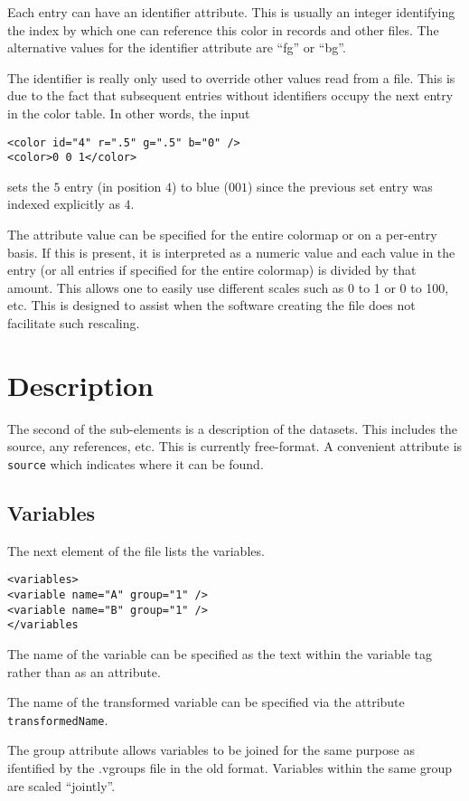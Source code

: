\documentclass{article}
\begin{document}
Each entry can have an identifier attribute.  This is usually an
integer identifying the index by which one can reference this color in
records and other files.  The alternative values for the identifier
attribute are ``fg'' or ``bg''.

The identifier is really only used to override other values read from
a file.  This is due to the fact that subsequent entries without
identifiers occupy the next entry  in the color table.
In other words, the input
\begin{verbatim}
<color id="4" r=".5" g=".5" b="0" />
<color>0 0 1</color>
\end{verbatim}
sets the $5$ entry (in position $4$) to blue ($0 0 1$) since the
previous set entry was indexed explicitly as $4$.


The attribute  value can be specified for the entire
colormap or on a per-entry basis.  If this is present, it is
interpreted as a numeric value and each value in the entry (or all
entries if specified for the entire colormap) is divided by that
amount.  This allows one to easily use different scales such as 0 to 1
or 0 to 100, etc. This is designed to assist when the software
creating the file does not facilitate such rescaling.


\section{Description}

The second of the sub-elements is a description of the datasets.  This
includes the source, any references, etc.  This is currently
free-format.  A convenient attribute is \texttt{source} which
indicates where it can be found.

\subsection{Variables}
The next element of the file 
lists the variables.
\begin{verbatim}
<variables>
<variable name="A" group="1" />
<variable name="B" group="1" />
</variables
\end{verbatim}
The name of the variable
can be specified as the text within the
variable tag rather than as an attribute.

The name of the transformed variable can be specified via the
attribute \texttt{transformedName}.

The group attribute allows variables to be joined for the same purpose
as ifentified by the .vgroups file in the old format.  Variables
within the same group are scaled ``jointly''.
\end{document}
